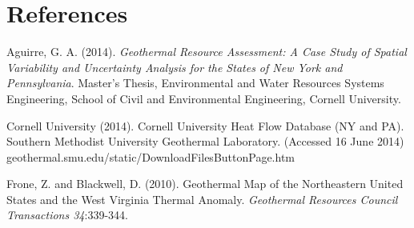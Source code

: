 \documentclass[12pt,a4paper]{article}
\begin{document}
\section*{References}

Aguirre, G. A. (2014). \textit{Geothermal Resource Assessment: A Case Study of Spatial Variability and Uncertainty Analysis for the States of New York and Pennsylvania}. Master's Thesis, Environmental and Water Resources Systems Engineering, School of Civil and Environmental Engineering, Cornell University.\hfill
\bigskip

\noindent
Cornell University (2014). Cornell University Heat Flow Database (NY and PA). Southern Methodist University Geothermal Laboratory. (Accessed 16 June 2014) geothermal.smu.edu/static/DownloadFilesButtonPage.htm \hfill
\bigskip

\noindent
Frone, Z. and Blackwell, D. (2010). Geothermal Map of the Northeastern United States and the West Virginia Thermal Anomaly. \textit{Geothermal Resources Council Transactions 34}:339-344.
\end{document}
